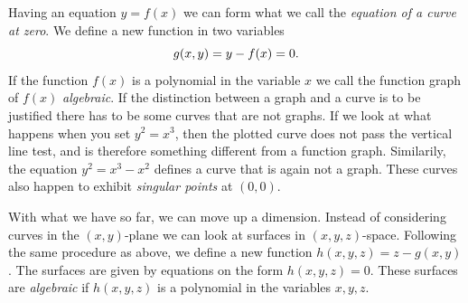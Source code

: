 \documentclass{article}
\theoremstyle{definition}
\begin{document}
Having an equation $y = f(x)$ we can form what we call the \emph{equation of a
curve at zero}. We define a new function in two variables
\begin{equation}
    \notag
    g(x, y) = y - f(x) = 0.
\end{equation}
If the function $f(x)$ is a polynomial in the variable $x$ we call the function
graph of $f(x)$ \emph{algebraic}. If the distinction between a graph and a
curve is to be justified there has to be some curves that are not graphs. If we
look at what happens when you set $y^2 = x^3$, then the plotted curve does not
pass the vertical line test, and is therefore something different from a
function graph. Similarily, the equation $y^2 = x^3 - x^2$ defines a curve that
is again not a graph. These curves also happen to exhibit \emph{singular
points} at $(0, 0)$.

With what we have so far, we can move up a dimension. Instead of considering
curves in the $(x, y)$-plane we can look at surfaces in $(x, y, z)$-space.
Following the same procedure as above, we define a new function $h(x, y, z) = z
- g(x, y)$. The surfaces are given by equations on the form $h(x, y, z) = 0$.
These surfaces are \emph{algebraic} if $h(x, y, z)$ is a polynomial in the
variables $x, y, z$. 
\end{document}
